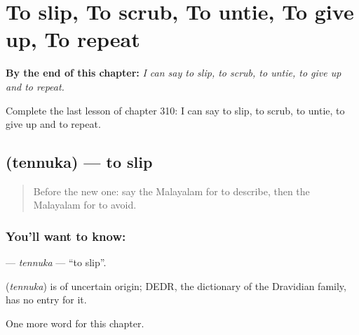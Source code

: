 
\chapter{To slip, To scrub, To untie, To give up, To repeat}
\label{ch:ml-to-slip-to-scrub-to-untie-to-give-up-to-repeat}

\begin{chapteropening}
\textbf{By the end of this chapter:} \emph{I can say to slip, to scrub, to untie, to give up and to repeat.}

Complete the last lesson of chapter 310: I can say to slip, to scrub, to untie, to give up and to repeat.
\end{chapteropening}

\section[\texorpdfstring{\ml{തെന്നുക} (tennuka)}{തെന്നുക (tennuka)}]{ (tennuka) — to slip}

\label{lesson:ML-C310-tennuka}



\begin{quote}
Before the new one: say the Malayalam for to describe, then the Malayalam for to avoid.
\end{quote}

\subsection*{You'll want to know: }
\textbf{} — \emph{tennuka} — \textquotedblleft{}to slip\textquotedblright{}.

\begin{cousinweb}
\textbf{} (\emph{tennuka}) is of uncertain origin; DEDR, the dictionary of the Dravidian family, has no entry for it.
\end{cousinweb}

\begin{grammarlens}[title={What you've built}]
One more word for this chapter.
\end{grammarlens}

